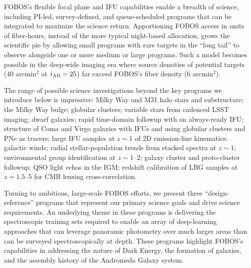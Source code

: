 \documentclass[oneside,11pt]{amsart}
\newcommand{\comment}[2][todo]{{\color{#1}[[{\bf #2}]]}}
\begin{document}
FOBOS's flexible focal plane and IFU capabilities enable a breadth of
science, including PI-led, survey-defined, and queue-scheduled
programs that can be integrated to maximize the science return.
Apportioning FOBOS access in units of fiber-hours, instead of the
more typical night-based allocation, grows the scientific pie by
allowing small programs with rare targets in the ``long tail'' to
observe alongside one or more medium or large programs. Such a model
becomes possible in the deep-wide imaging era where source densities
of potential targets (40 arcmin$^2$ at $i_{\rm AB} = 25$) far exceed
FOBOS's fiber density (6 arcmin$^2$).

The range of possible science investigations beyond the key programs
we introduce below is impressive: Milky Way and M31 halo stars and
substructure; the Milky Way bulge; globular clusters; variable stars
from cadenced LSST imaging; dwarf galaxies; rapid time-domain
followup with an always-ready IFU; structure of Coma and Virgo
galaxies with IFUs and using globular clusters and PNe as tracers;
large IFU samples at $z \sim 1$ of 2D emission-line kinematics;
galactic winds; radial stellar-population trends from stacked spectra
at $z \sim 1$; environmental group identification at $z \sim 1$--2;
galaxy cluster and proto-cluster followup; QSO light echos in the
IGM; redshift calibration of LBG samples at $z = 1.5$--5 for CMB
lensing cross-correlation.

Turning to ambitious, large-scale FOBOS efforts, we present three
``design-reference'' programs that represent our primary science
goals and drive science requirements. An underlying theme in these
programs is delivering the spectroscopic training sets required to
enable an array of deep-learning approaches that can leverage
panoramic photometry over much larger areas than can be surveyed
spectroscopically at depth. These programs highlight FOBOS's
capabilities in addressing the nature of Dark Energy, the formation
of galaxies, and the assembly history of the Andromeda Galaxy system.

\end{document}
